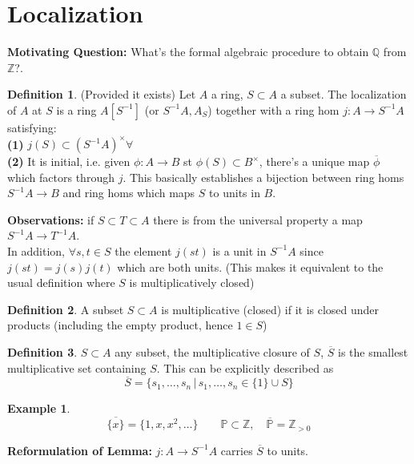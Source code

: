 \documentclass{article}
\theoremstyle{definition}
\newtheorem{example}{Example}[section]
\theoremstyle{definition}
\newtheorem{definition}{Definition}[section]
\theoremstyle{remark}
\newcommand{\Z}{\mathbb{Z}}
\newcommand{\Q}{\mathbb{Q}}
\newcommand{\mb}[1]{\mathbb{#1}}
\newcommand{\un}{\cup}
\begin{document}
\section{Localization}

\textbf{Motivating Question:} What's the formal algebraic procedure to obtain $\Q$ from $\Z$?.

\begin{definition}
	(Provided it exists) Let $A$ a ring, $S \subset A$ a subset. 
	The localization of $A$ at $S$ is a ring $A[S^{-1}]$ (or $S^{-1}A, A_S$) together with a ring hom $j:A \to S^{-1}A$ satisfying:\\
	\indent \textbf{(1)} $j(S) \subset (S^{-1}A)^{\times} \forall$\\
	\indent \textbf{(2)} It is initial, i.e. given $\phi: A \to B$ st $\phi(S) \subset B^{\times}$, there's a unique map $\overline{\phi}$ which factors through $j$.
	This basically establishes a bijection between ring homs $S^{-1}A \to B$ and ring homs which maps $S$ to units in $B$.
\end{definition}

\textbf{Observations: } if $S \subset T \subset A$ there is from the universal property a map $S^{-1}A \to T^{-1}A$.\\

In addition, $\forall s,t \in S$ the element $j(st)$ is a unit in $S^{-1}A$ since $j(st) = j(s)j(t)$
which are both units. 
(This makes it equivalent to the usual definition where $S$ is multiplicatively closed)

\begin{definition}
	A subset $S \subset A$ is multiplicative (closed) if it is closed under products (including the empty product, hence $1 \in S$)
\end{definition}

\begin{definition}
	$S \subset A$ any subset, the multiplicative closure of $S$, $\overline{S}$ is the smallest multiplicative set containing $S$.
This can be explicitly described as 
\[\overline{S} = \{s_1,\dots, s_n \,|\, s_1, \dots, s_n \in \{1\} \un S\}\]
\end{definition}
 
\begin{example}
	\[\overline{\{x\}} = \{1, x, x^2, \dots \} \quad \quad \mb{P} \subset \Z, \quad \overline{\mb{P}} = \Z_{>0}\]
\end{example}

\textbf{Reformulation of Lemma:} $j: A \to S^{-1}A$ carries $\overline{S}$ to units.
\end{document}
